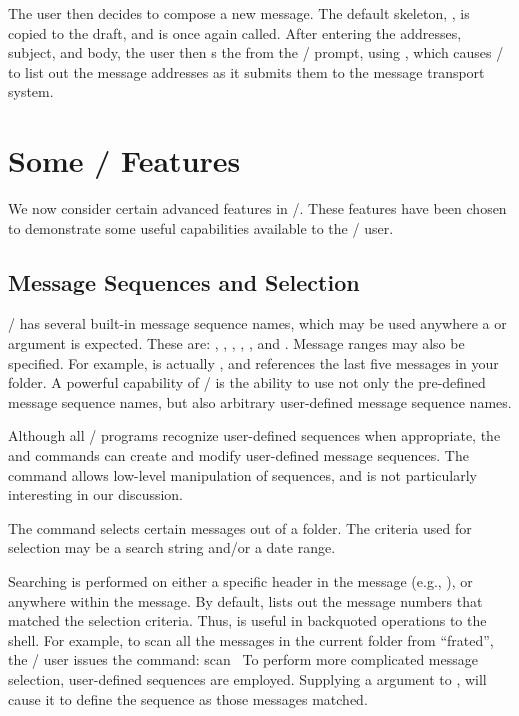 The user then decides to compose a new message.
The default skeleton, , is copied to the draft,
and  is once again called.
After entering the addresses, subject, and body,
the user then s the  from the \whatnow/ prompt,
using , which causes
\MH/ to list out the message addresses as it submits them
to the message transport system.

\section{Some \MH/ Features}			%
We now consider certain advanced features in \MH/.
These features have been chosen to demonstrate some useful capabilities
available to the \MH/ user.

\subsection{Message Sequences and Selection}	%
\MH/ has several built-in message sequence names, which may
be used anywhere a  or  argument is expected.
These are:
, , , , , and .
Message ranges may also be specified.
For example,  is actually , and
 references the last five messages in your
 folder.
A powerful capability of \MH/ is the ability to use not only the pre-defined
message sequence names,
but also arbitrary user-defined message sequence names.

Although all \MH/ programs recognize user-defined sequences when appropriate, 
the  and  commands can create and modify 
user-defined message sequences.
The  command allows low-level manipulation of sequences,
and is not particularly interesting in our discussion.

The  command selects certain messages out of a folder.
The criteria used for selection may be a search string and/or a date range.

Searching is performed on either a specific header in the message
(e.g., ),
or anywhere within the message.
By default,
 lists out the message numbers that matched
the selection criteria.
Thus,  is useful in backquoted operations to the shell.
For example, to scan all the messages in the current folder from ``frated'',
the \MH/ user issues the command:
\example scan\ \endexample
To perform more complicated message selection,
user-defined sequences are employed.
Supplying a 
argument to , will cause it to define the
sequence  as those messages matched.

